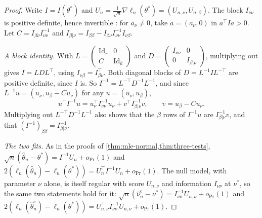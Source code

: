 \begin{proof}
Write $I = I(\theta^*)$ and $U_n = \frac{1}{\sqrt{n}}\nabla\ell_n(\theta^*) = (U_{n,\nu}, U_{n,\beta})$.
The block $I_{\nu\nu}$ is positive definite, hence invertible : for $a_\nu \neq 0$, take $a = (a_\nu, 0)$ in $a^\top Ia > 0$.
Let $C = I_{\beta\nu}I_{\nu\nu}^{-1}$ and $I_{\beta|\nu} = I_{\beta\beta} - I_{\beta\nu}I_{\nu\nu}^{-1}I_{\nu\beta}$.

\textit{A block identity.} With $L = \begin{pmatrix} \mathrm{Id}_r & 0 \\ C & \mathrm{Id}_k\end{pmatrix}$ and $D = \begin{pmatrix} I_{\nu\nu} & 0 \\ 0 & I_{\beta|\nu}\end{pmatrix}$, multiplying out gives $I = LDL^\top$, using $I_{\nu\beta} = I_{\beta\nu}^\top$.
Both diagonal blocks of $D = L^{-1}IL^{-\top}$ are positive definite, since $I$ is.
So $I^{-1} = L^{-\top}D^{-1}L^{-1}$, and since $L^{-1}u = (u_\nu, u_\beta - Cu_\nu)$ for any $u = (u_\nu, u_\beta)$,
\[
u^\top I^{-1}u = u_\nu^\top I_{\nu\nu}^{-1}u_\nu + v^\top I_{\beta|\nu}^{-1}v, \qquad v = u_\beta - Cu_\nu. \tag{$\dagger$}
\]
Multiplying out $L^{-\top}D^{-1}L^{-1}$ also shows that the $\beta$ rows of $I^{-1}u$ are $I_{\beta|\nu}^{-1}v$, and that $(I^{-1})_{\beta\beta} = I_{\beta|\nu}^{-1}$.

\textit{The two fits.} As in the proofs of \cref{thm:mle-normal,thm:three-tests}, $\sqrt{n}(\hat{\theta}_n - \theta^*) = I^{-1}U_n + o_\Pr(1)$ and $2(\ell_n(\hat{\theta}_n) - \ell_n(\theta^*)) = U_n^\top I^{-1}U_n + o_\Pr(1)$.
The null model, with parameter $\nu$ alone, is itself regular with score $U_{n,\nu}$ and information $I_{\nu\nu}$ at $\nu^*$, so the same two statements hold for it: $\sqrt{n}(\hat{\nu}^{\mathrm{c}}_n - \nu^*) = I_{\nu\nu}^{-1}U_{n,\nu} + o_\Pr(1)$ and $2(\ell_n(\hat{\theta}^{\mathrm{c}}_n) - \ell_n(\theta^*)) = U_{n,\nu}^\top I_{\nu\nu}^{-1}U_{n,\nu} + o_\Pr(1)$.


\end{proof}
